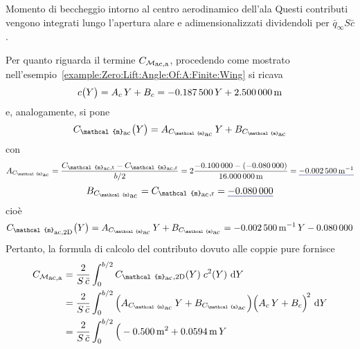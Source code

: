 \documentclass[[12pt,twoside]{book}
\begin{document}
\begin{myExampleX}{Momento di beccheggio intorno al centro aerodinamico dell'ala}{}
\noindent
Questi contributi vengono integrati lungo l'apertura alare e adimensionalizzati dividendoli
per $\bar{q}_\infty S \bar{c}$.

Per quanto riguarda il termine $C_{\mathcal{M}_\mathlarger{\mathrm{ac,a}}}$,
procedendo come mostrato nell'esempio~\ref{example:Zero:Lift:Angle:Of:A:Finite:Wing}
si ricava
\[
c \big( Y \big) = A_c \, Y + B_c
  = \SI[round-precision=3]{\myCoeffAChordWing}{} \, Y
    + \SI[round-precision=2]{\myCoeffBChordWingMT}{\metre}
\]
e, analogamente, si pone
\[
C_{\mathcal{m}_\mathlarger{\mathrm{ac}}} \big( Y \big) 
  = A_{C_{\mathcal{m}_\mathlarger{\mathrm{ac}}}} \, Y + B_{C_{\mathcal{m}_\mathlarger{\mathrm{ac}}}}
\]
con
\[
A_{C_{\mathcal{m}_\mathlarger{\mathrm{ac}}}}
  = \frac{C_{\mathcal{m}_\mathlarger{\mathrm{ac}},\mathrm{t}} 
    - C_{\mathcal{m}_\mathlarger{\mathrm{ac}},\mathrm{r}}}{b/2}
  = 
    2 \frac{
      \SI[round-precision=3]{\myCmZeroTipWing}{} 
      - ( \SI[round-precision=3]{\myCmZeroRootWing}{} )
    }{
      \SI[round-precision=2]{\mySpanWingMT}{\metre}
    }
  = 
    \mathunderline{mydarkblue}{ 
      \SI[round-precision=5]{\myCoeffACmZeroWingMT}{\metre^{-1}} 
    }
\]
\[
B_{C_{\mathcal{m}_\mathlarger{\mathrm{ac}}}}
  = C_{\mathcal{m}_\mathlarger{\mathrm{ac}},\mathrm{r}}
  = \mathunderline{mydarkblue}{ \SI[round-precision=3]{\myCoeffBCmZeroWing}{} }
\]
cioè
\[
C_{\mathcal{m}_\mathlarger{\mathrm{ac,2D}}} \big( Y \big) 
  = A_{C_{\mathcal{m}_\mathlarger{\mathrm{ac}}}} \, Y + B_{C_{\mathcal{m}_\mathlarger{\mathrm{ac}}}}
  = \SI[round-precision=5]{\myCoeffACmZeroWingMT}{\metre^{-1}} \, Y
    \SI[round-precision=3]{\myCoeffBCmZeroWing}{}
\]
%
Pertanto, la formula di calcolo del contributo dovuto alle coppie pure fornisce
\[
\begin{split}
C_{\mathcal{M}_\mathlarger{\mathrm{ac,a}}}
  & {}= \frac{2}{S\,\bar{c}} \int_0^{b/2} 
    C_{\mathcal{m}_\mathlarger{\mathrm{ac}},\mathrm{2D}}(Y) \; c^2(Y)\, \diff{Y}
\\
  & {}= 
  \frac{2}{S\,\bar{c}} \int_0^{b/2} 
    \Big( 
      A_{C_{\mathcal{m}_\mathlarger{\mathrm{ac}}}} \, Y + B_{C_{\mathcal{m}_\mathlarger{\mathrm{ac}}}} 
    \Big)
    \Big( A_c \, Y + B_c \Big)^{\! 2}
    \, \diff{Y}
\\
  & {}= 
  \frac{2}{S\,\bar{c}} \int_0^{b/2} 
    \Big( 
      \SI[round-mode=figures,round-precision=3,
        fixed-exponent=0,scientific-notation=fixed]{\myCoeffAWing}{\metre^2}
      + 
      \SI[round-mode=figures,round-precision=3,
        ]{\myCoeffBWing}{\metre}\, Y

\end{split}\]
\end{myExampleX}
\end{document}
